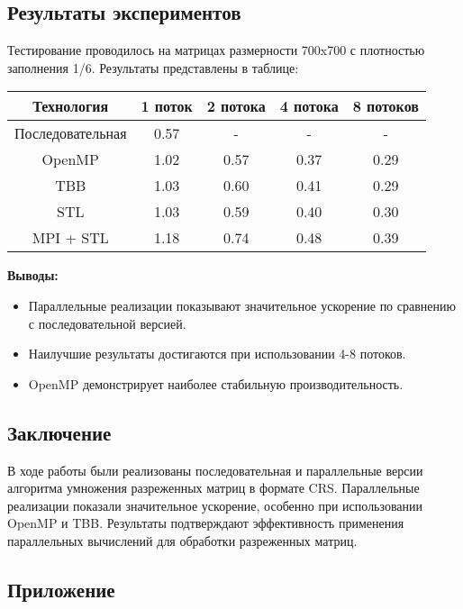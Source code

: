 \documentclass[12pt]{article}
\begin{document}
\newpage
\begin{center}
    \section*{Результаты экспериментов}
\end{center}
Тестирование проводилось на матрицах размерности 700x700 с плотностью заполнения 1/6. Результаты представлены в таблице:

\begin{tabular}{|c|c|c|c|c|}
    \hline
    Технология & 1 поток & 2 потока & 4 потока & 8 потоков \\ \hline
    Последовательная & 0.57 & - & - & - \\ \hline
    OpenMP & 1.02 & 0.57 & 0.37 & 0.29 \\ \hline
    TBB & 1.03 & 0.60 & 0.41 & 0.29 \\ \hline
    STL & 1.03 & 0.59 & 0.40 & 0.30 \\ \hline
    MPI + STL & 1.18 & 0.74 & 0.48 & 0.39 \\ \hline
\end{tabular}

\vspace{0.5cm}
\textbf{Выводы:}
\begin{itemize}
    \item Параллельные реализации показывают значительное ускорение по сравнению с последовательной версией.
    \item Наилучшие результаты достигаются при использовании 4-8 потоков.
    \item OpenMP демонстрирует наиболее стабильную производительность.
\end{itemize}

\newpage
\begin{center}
    \section*{Заключение}
\end{center}
В ходе работы были реализованы последовательная и параллельные версии алгоритма умножения разреженных матриц в формате CRS. Параллельные реализации показали значительное ускорение, особенно при использовании OpenMP и TBB. Результаты подтверждают эффективность применения параллельных вычислений для обработки разреженных матриц.

\newpage
\begin{center}
    \section*{Приложение}
\end{center}
\end{document}
